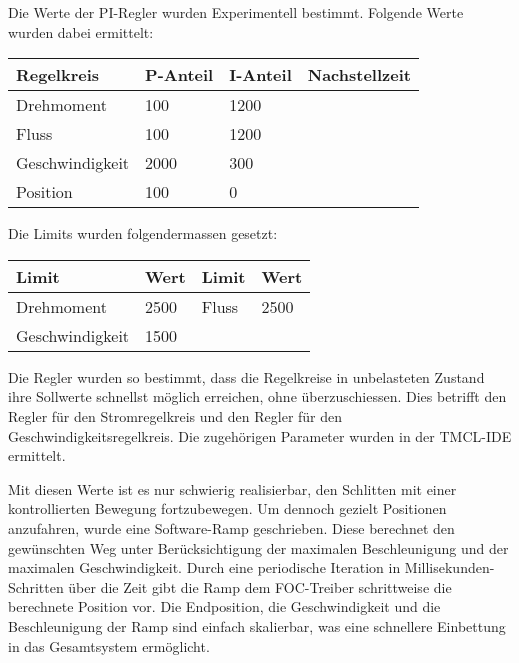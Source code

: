 Die Werte der PI-Regler wurden Experimentell bestimmt. Folgende Werte wurden dabei ermittelt:

\begin{tabularx}{\linewidth}{|l|X|X|l|}
\hline
\textbf{Regelkreis} & \textbf{P-Anteil} & \textbf{I-Anteil} & \textbf{Nachstellzeit}\\
\hline
Drehmoment & 100 & 1200 & \\
\hline
Fluss & 100 & 1200 & \\
\hline
Geschwindigkeit & 2000 & 300 & \\
\hline
Position & 100 & 0 & \\
\hline
\end{tabularx}


Die Limits wurden folgendermassen gesetzt:

\begin{tabularx}{\linewidth}{|l|X||l|X|}
\hline
\textbf{Limit} & \textbf{Wert} & \textbf{Limit} & \textbf{Wert}\\
\hline
Drehmoment & 2500 & Fluss & 2500\\
\hline
Geschwindigkeit & 1500 &  & \\
\hline
\end{tabularx}

Die Regler wurden so bestimmt, dass die Regelkreise in unbelasteten Zustand ihre Sollwerte schnellst möglich erreichen, ohne überzuschiessen. Dies betrifft den Regler für den Stromregelkreis und den Regler für den Geschwindigkeitsregelkreis. Die zugehörigen Parameter wurden in der TMCL-IDE ermittelt. 

Mit diesen Werte ist es nur schwierig realisierbar, den Schlitten mit einer kontrollierten Bewegung fortzubewegen. Um dennoch gezielt Positionen anzufahren, wurde eine Software-Ramp geschrieben. Diese berechnet den gewünschten Weg unter Berücksichtigung der maximalen Beschleunigung und der maximalen Geschwindigkeit. Durch eine periodische Iteration in Millisekunden-Schritten über die Zeit gibt die Ramp dem FOC-Treiber schrittweise die berechnete Position vor. Die Endposition, die Geschwindigkeit und die Beschleunigung der Ramp sind einfach skalierbar, was eine schnellere Einbettung in das Gesamtsystem ermöglicht.